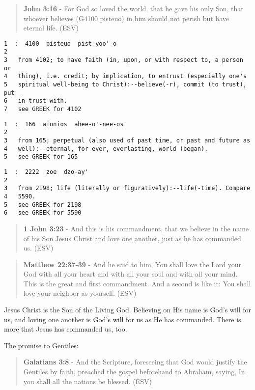 \documentclass[11pt]{article}
\begin{document}
\begin{quote}
\textbf{John 3:16} - For God so loved the world, that he gave his only Son, that whoever believes (G4100 pisteuo) in him should not perish but have eternal life. (ESV)
\end{quote}

\begin{verbatim}
1  :  4100  pisteuo  pist-yoo'-o
2  
3   from 4102; to have faith (in, upon, or with respect to, a person or
4   thing), i.e. credit; by implication, to entrust (especially one's
5   spiritual well-being to Christ):--believe(-r), commit (to trust), put
6   in trust with.
7   see GREEK for 4102
\end{verbatim}

\begin{verbatim}
1  :  166  aionios  ahee-o'-nee-os
2  
3   from 165; perpetual (also used of past time, or past and future as
4   well):--eternal, for ever, everlasting, world (began).
5   see GREEK for 165
\end{verbatim}

\begin{verbatim}
1  :  2222  zoe  dzo-ay'
2  
3   from 2198; life (literally or figuratively):--life(-time). Compare
4   5590.
5   see GREEK for 2198
6   see GREEK for 5590
\end{verbatim}

\begin{quote}
\textbf{1 John 3:23} - And this is his commandment, that we believe in the name of his Son Jesus Christ and love one another, just as he has commanded us. (ESV)
\end{quote}

\begin{quote}
\textbf{Matthew 22:37-39} - And he said to him, You shall love the Lord your God with all your heart and with all your soul and with all your mind. This is the great and first commandment. And a second is like it: You shall love your neighbor as yourself. (ESV)
\end{quote}

Jesus Christ is the Son of the Living God. Believing on His name is God's will for us, and loving one another is God's will for us as He has commanded. There is more that Jesus has commanded us, too.

The promise to Gentiles:

\begin{quote}
\textbf{Galatians 3:8} - And the Scripture, foreseeing that God would justify the Gentiles by faith, preached the gospel beforehand to Abraham, saying, In you shall all the nations be blessed. (ESV)
\end{quote}
\end{document}
